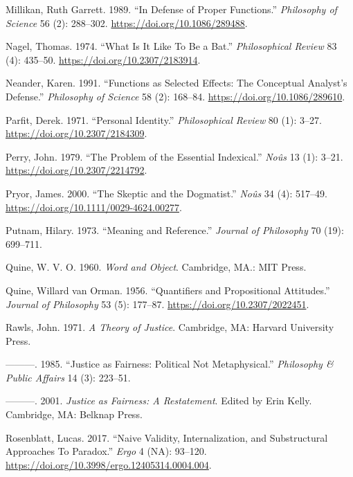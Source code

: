 \documentclass[
  12pt,
  letterpaper,
  DIV=11,
  numbers=noendperiod]{scrartcl}
\newlength{\cslhangindent}
\newenvironment{CSLReferences}[2] %
 {\begin{list}{}{%
  \setlength{\itemindent}{0pt}
  \setlength{\leftmargin}{0pt}
  \setlength{\parsep}{0pt}
  \ifodd #1
   \setlength{\leftmargin}{\cslhangindent}
   \setlength{\itemindent}{-1\cslhangindent}
  \fi
  \setlength{\itemsep}{#2\baselineskip}}}
 {\end{list}}
\begin{document}
\begin{CSLReferences}{1}{0}
Millikan, Ruth Garrett. 1989. {``In Defense of Proper Functions.''}
\emph{Philosophy of Science} 56 (2): 288--302.
\url{https://doi.org/10.1086/289488}.

Nagel, Thomas. 1974. {``What Is It Like To Be a Bat.''}
\emph{Philosophical Review} 83 (4): 435--50.
\url{https://doi.org/10.2307/2183914}.

Neander, Karen. 1991. {``Functions as Selected Effects: The Conceptual
Analyst's Defense.''} \emph{Philosophy of Science} 58 (2): 168--84.
\url{https://doi.org/10.1086/289610}.

Parfit, Derek. 1971. {``Personal Identity.''} \emph{Philosophical
Review} 80 (1): 3--27. \url{https://doi.org/10.2307/2184309}.

Perry, John. 1979. {``The Problem of the Essential Indexical.''}
\emph{Noûs} 13 (1): 3--21. \url{https://doi.org/10.2307/2214792}.

Pryor, James. 2000. {``The Skeptic and the Dogmatist.''} \emph{Noûs} 34
(4): 517--49. \url{https://doi.org/10.1111/0029-4624.00277}.

Putnam, Hilary. 1973. {``Meaning and Reference.''} \emph{Journal of
Philosophy} 70 (19): 699--711.

Quine, W. V. O. 1960. \emph{Word and Object}. Cambridge, MA.: MIT Press.

Quine, Willard van Orman. 1956. {``Quantifiers and Propositional
Attitudes.''} \emph{Journal of Philosophy} 53 (5): 177--87.
\url{https://doi.org/10.2307/2022451}.

Rawls, John. 1971. \emph{A Theory of Justice}. Cambridge, MA: Harvard
University Press.

---------. 1985. {``Justice as Fairness: Political Not Metaphysical.''}
\emph{Philosophy \& Public Affairs} 14 (3): 223--51.

---------. 2001. \emph{Justice as Fairness: A Restatement}. Edited by
Erin Kelly. Cambridge, MA: Belknap Press.

Rosenblatt, Lucas. 2017. {``Naive Validity, Internalization, and
Substructural Approaches To Paradox.''} \emph{Ergo} 4 (NA): 93--120.
\url{https://doi.org/10.3998/ergo.12405314.0004.004}.


\end{CSLReferences}
\end{document}
